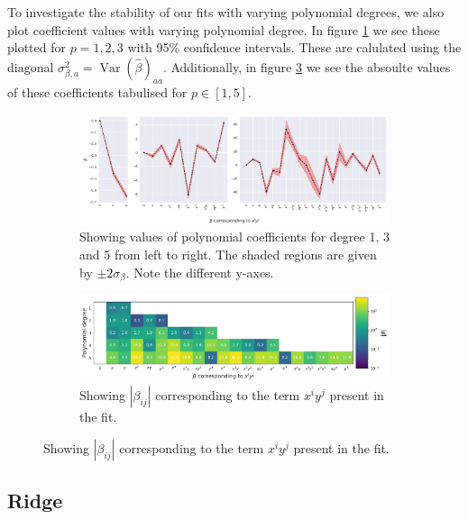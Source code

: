 \documentclass[twocolumn,english,notitlepage]{article}
\renewcommand{\var}{\operatorname{Var}}
\begin{document}
    To investigate the stability of our fits with varying polynomial degrees, we also plot coefficient values with varying polynomial degree. In figure \ref{fig:res:OLS_beta_values_plot} we see these plotted for $p = 1,2,3$ with 95\% confidence intervals. These are calulated using the diagonal $\sigma^2_{\beta,a} = \var{(\hat{\beta})_{aa}}$. Additionally, in figure \ref{fig:res:OLS_beta_values_table} we see the absoulte values of these coefficients tabulised for $p \in [1,5]$.

    \begin{figure}
        \begin{subfigure}{\textwidth}
            \centering
            \includegraphics[width=\linewidth]{linreg_coefs_plots.pdf}
            \caption{Showing values of polynomial coefficients for degree 1, 3 and 5 from left to right. The shaded regions are given by $\pm 2\sigma_\beta$. Note the different y-axes.} 
            \label{fig:res:OLS_beta_values_plot}
        \end{subfigure}
        \begin{subfigure}{\textwidth}
            \centering
            \includegraphics[width=\linewidth]{linreg_coefs_table.pdf}
            \caption{Showing $|\beta_{ij}|$ corresponding to the term $x^i y^j$ present in the fit.}
            \label{fig:res:OLS_beta_values_table}    
        \end{subfigure}
    \end{figure}

    \subsection{Ridge}
\end{document}
